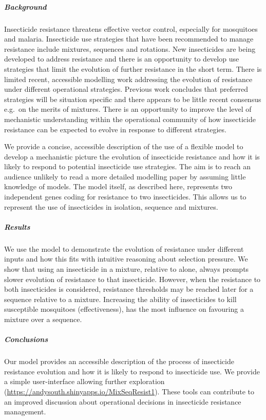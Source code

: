 \documentclass[11pt,]{article}
\let\oldsubparagraph\subparagraph
\renewcommand{\subparagraph}[1]{\oldsubparagraph{#1}\mbox{}}
\begin{document}
\subparagraph{Background}\label{background}

Insecticide resistance threatens effective vector control, especially
for mosquitoes and malaria. Insecticide use strategies that have been
recommended to manage resistance include mixtures, sequences and
rotations. New insecticides are being developed to address resistance
and there is an opportunity to develop use strategies that limit the
evolution of further resistance in the short term. There is limited
recent, accessible modelling work addressing the evolution of resistance
under different operational strategies. Previous work concludes that
preferred strategies will be situation specific and there appears to be
little recent consensus e.g.~on the merits of mixtures. There is an
opportunity to improve the level of mechanistic understanding within the
operational community of how insecticide resistance can be expected to
evolve in response to different strategies.

We provide a concise, accessible description of the use of a flexible
model to develop a mechanistic picture the evolution of insecticide
resistance and how it is likely to respond to potential insecticide use
strategies. The aim is to reach an audience unlikely to read a more
detailed modelling paper by assuming little knowledge of models. The
model itself, as described here, represents two independent genes coding
for resistance to two insecticides. This allows us to represent the use
of insecticides in isolation, sequence and mixtures.

\subparagraph{Results}\label{results}

We use the model to demonstrate the evolution of resistance under
different inputs and how this fits with intuitive reasoning about
selection pressure. We show that using an insecticide in a mixture,
relative to alone, always prompts slower evolution of resistance to that
insecticide. However, when the resistance to both insecticides is
considered, resistance thresholds may be reached later for a sequence
relative to a mixture. Increasing the ability of insecticides to kill
susceptible mosquitoes (effectiveness), has the most influence on
favouring a mixture over a sequence.

\subparagraph{Conclusions}\label{conclusions}

Our model provides an accessible description of the process of
insecticide resistance evolution and how it is likely to respond to
insecticide use. We provide a simple user-interface allowing further
exploration (\url{https://andysouth.shinyapps.io/MixSeqResist1}). These
tools can contribute to an improved discussion about operational
decisions in insecticide resistance management.
\end{document}
